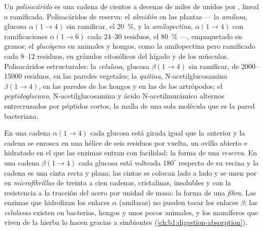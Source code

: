 \begin{definition}[Polisacárido]\label{def:b1:carbohydrates:polysaccharide}
Un \emph{polisacárido} es una cadena de cientos a
decenas de miles de  unidos por , lineal o
ramificada. Polisacáridos de reserva: el \emph{almidón} en
las plantas --- la \emph{amilosa}, glucosa $\alpha(1{\to}4)$ sin ramificar,
el \qty{20}{\%}, y la \emph{amilopectina}, $\alpha(1{\to}4)$ con
ramificaciones $\alpha(1{\to}6)$ cada \qtyrange{24}{30}{} residuos, el
\qty{80}{\%} ---, empaquetado en granos; el
\emph{glucógeno} en animales y hongos, como la amilopectina
pero ramificado cada \qtyrange{8}{12}{} residuos, en gránulos citosólicos
del hígado y de los músculos. Polisacáridos estructurales: la
\emph{celulosa}, glucosa $\beta(1{\to}4)$ sin ramificar, de
\qtyrange{2000}{15000}{} residuos, en las paredes vegetales; la
\emph{quitina}, N-acetilglucosamina $\beta(1{\to}4)$, en las
paredes de los hongos y en las  de los artrópodos; el
\emph{peptidoglucano}, N-acetilglucosamina y ácido
N-acetilmurámico alternos entrecruzados por péptidos cortos, la malla de una
sola molécula que es la pared bacteriana.
\end{definition}

\begin{proposition}\label{prop:b1:carbohydrates:alphabeta}
En una cadena $\alpha(1{\to}4)$ cada glucosa está girada igual que la
anterior y la cadena se enrosca en una hélice de seis residuos por vuelta,
un ovillo abierto e hidratado en el que las enzimas entran con facilidad: la
forma de una \emph{reserva}. En una cadena $\beta(1{\to}4)$ cada glucosa
está volteada $180^\circ$ respecto de su vecina y la cadena es una cinta
recta y plana; las cintas se colocan lado a lado y se unen por  en \emph{microfibrillas} de treinta a cien cadenas, cristalinas,
insolubles y con la resistencia a la tracción del acero por unidad de masa:
la forma de una \emph{fibra}. Las enzimas que hidrolizan los enlaces
$\alpha$ (amilasas) no pueden tocar los enlaces $\beta$; las
\emph{celulasas} existen en bacterias, hongos y unos pocos animales, y los
mamíferos que viven de la hierba lo hacen gracias a simbiontes
(\cref{ch:b1:digestion-absorption}).
\end{proposition}

